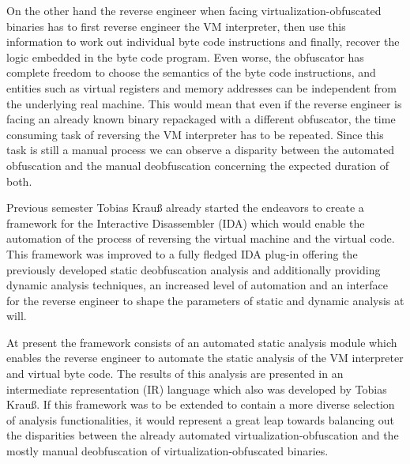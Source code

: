 \documentclass[10pt,twoside,a4paper,bibliography=totoc]{scrbook}
\newcommand{\echoOther}[1]{Tobias Krau{\ss}}
\begin{document}
On the other hand the reverse engineer when facing virtualization-obfuscated binaries has to first reverse engineer the VM interpreter, then use this information to work out individual byte code instructions and finally, recover the logic embedded in the byte code program\cite{Coogan:2011:DVS:2046707.2046739}. Even worse, the obfuscator has complete freedom to choose the semantics of the byte code instructions, and entities such as virtual registers and memory addresses can be independent from the underlying real machine\cite{DBLP:conf/sp/SharifLGL09}. This would mean that even if the reverse engineer is facing an already known binary repackaged with a different obfuscator, the time consuming task of reversing the VM interpreter has to be repeated. Since this task is still a manual process we can observe a disparity between the automated obfuscation and the manual deobfuscation concerning the expected duration of both.

Previous semester \echoOther{} already started the endeavors to create a framework for the Interactive Disassembler (IDA) which would enable the automation of the process of reversing the virtual machine and the virtual code\cite{Krau:Thesis2016}. This framework was improved to a fully fledged IDA plug-in offering the previously developed static deobfuscation analysis and additionally providing dynamic analysis techniques, an increased level of automation and an interface for the reverse engineer to shape the parameters of static and dynamic analysis at will.

At present the framework consists of an automated static analysis module which enables the reverse engineer to automate the static analysis of the VM interpreter and virtual byte code. The results of this analysis are presented in an intermediate representation (IR) language which also was developed by \echoOther{}\cite{Krau:Thesis2016}. If this framework was to be extended to contain a more diverse selection of analysis functionalities, it would represent a great leap towards balancing out the disparities between the already automated virtualization-obfuscation and the mostly manual deobfuscation of virtualization-obfuscated binaries.
\end{document}
